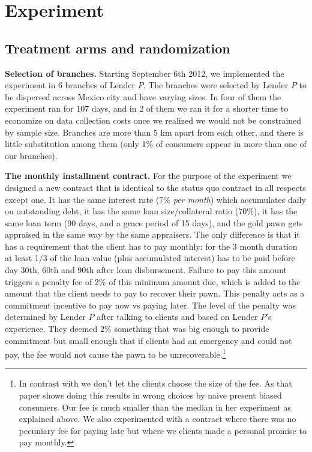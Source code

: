 \documentclass[oneside,11pt]{article}
\begin{document}
\section{Experiment} \label{Experiment}

\subsection{Treatment arms and randomization}

\noindent \textbf{Selection of branches.} Starting September 6th 2012, we implemented the experiment in 6 branches of Lender $P$. The branches were selected by Lender $P$ to be dispersed across Mexico city and have varying sizes. In four of them the experiment ran for 107 days, and in 2 of them we ran it for a shorter time to economize on data collection costs once we realized we would not be constrained by sample size. %
Branches are more than 5 km apart from each other, and there is little substitution among them (only 1\% of consumers appear in more than one of our branches).

\vspace{.2in}
\noindent \textbf{The monthly installment contract.} For the purpose of the experiment we designed a new contract that is identical to the status quo contract in all respects except one. It has the same interest rate (7\% \textit{per month}) which accumulates daily on outstanding debt, it has the same loan size/collateral ratio (70\%), it has the same loan term (90 days, and a grace period of 15 days), and the gold pawn gets appraised in the same way by the same appraisers. The only difference is that it has a requirement that the client has to pay monthly: for the 3 month duration at least 1/3 of the loan value (plus accumulated interest) has to be paid before day 30th, 60th and 90th after loan disbursement. Failure to pay this amount triggers a penalty fee of 2\% of this minimum amount due, which is added to the amount that the client needs to pay to recover their pawn. This penalty acts as a commitment incentive to pay now vs paying later. The level of the penalty was determined by Lender $P$ after talking to clients and based on Lender $P$'s experience. They deemed 2\% something that was big enough to provide commitment but small enough that if clients had an emergency and could not pay, the fee would not cause the pawn to be unrecoverable.\footnote{In contrast with \cite{John} we don't let the clients choose the size of the fee. As that paper shows doing this results in wrong choices by naive present biased consumers. Our fee is much smaller than the median in her experiment as explained above. We also experimented with a contract where there was no pecuniary fee for paying late but where we clients made a personal promise to pay monthly.}
\end{document}
